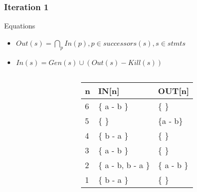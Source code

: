\begin{frame}[fragile, t]
 \frametitle{Iteration 1} 

\begin{center}
\begin{scriptsize}
\begin{minipage}{8cm}
    \begin{block}{Equations}
    \begin{itemize}
        \item $Out(s) = \bigcap_p In(p), p \in successors(s), s \in stmts$
	    \item $In(s) = Gen(s) \cup (Out(s) - Kill(s))$  
    \end{itemize}
    \end{block}
\end{minipage}
\end{scriptsize}
\end{center}

\begin{columns}[T]
\begin{column}[T]{.4\textwidth}
    \vspace{0pt}
    
    \end{column}
    \begin{column}[T]{.6\textwidth}
\vspace{30pt}    
	\begin{scriptsize}
	   \begin{table}[]
\begin{tabular}{|l|l|l|}
\hline
n & IN{[}n{]} & OUT{[}n{]} \\ \hline
6  & \{ a - b \} & \{ \} \pause \\ \hline
5  & \{ \} & \{a - b\} \pause \\ \hline
4  & \{ b - a \} & \{ \} \pause \\ \hline
3  & \{ a - b \} & \{ \} \pause \\ \hline
2  & \{ a - b, b - a \} & \{ a - b \}\pause \\ \hline
1  & \{ b - a \} & \{  \}\pause \\ \hline
\end{tabular}
\end{table}   
	\end{scriptsize}
	\end{column}
    
\end{columns}

\end{frame}






















